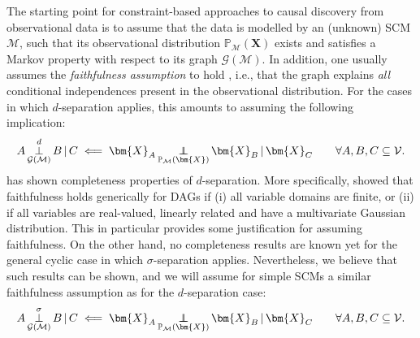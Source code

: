 \documentclass[twoside,11pt]{article}
\DeclareMathOperator*{\CI}{{\,\perp\mkern-12mu\perp\,}}
\DeclareMathOperator*{\SEP}{\perp}
\newcommand\indep[4]{{#1} \CI_{#4} {#2} \given {#3}}
\newcommand{\dsep}[4]{{#1} \SEP_{#4}^d {#2} \given {#3}}
\newcommand{\sigmasep}[4]{{#1} \SEP_{#4}^\sigma {#2} \given {#3}}
\newcommand{\Prb}{\mathbb{P}}
\newcommand\B[1]{\bm{#1}}
\newcommand\C[1]{\mathcal{#1}}
\newcommand\given{\,|\,}
\newcommand{\Joris}[1]{{\color{blue}#1}}
\begin{document}


The starting point for constraint-based approaches to causal discovery from observational data is 
to assume that the data is modelled by an (unknown) SCM $\C{M}$, such that its observational
distribution $\Prb_{\C{M}}(\B{X})$ exists and satisfies a Markov property with respect to its graph
$\C{G}(\C{M})$. In addition, one usually assumes the \emph{faithfulness assumption} to hold \citep{SGS2000,Pearl2009}, 
i.e., that the graph explains \emph{all} conditional independences present in the 
observational distribution. For the cases in which $d$-separation applies, this amounts to assuming
the following implication:
$$\dsep{A}{B}{C}{\C{G}(\C{M})} \impliedby \indep{\B{X}_A}{\B{X}_B}{\B{X}_C}{\Prb_{\C{M}}(\B{X})} \qquad \forall A,B,C \subseteq \C{V}.$$
\citet{Meek1995} has shown completeness properties of $d$-separation. More specifically,  \citet{Meek1995} 
showed that faithfulness holds generically for DAGs if (i) all variable domains are finite, or
(ii) if all variables are real-valued, linearly related and have a multivariate Gaussian distribution. 
This in particular provides some justification for assuming faithfulness.
On the other hand, no completeness results are known yet for the general
cyclic case in which $\sigma$-separation applies. Nevertheless, we believe that such results can be
shown, and we will assume for simple SCMs a similar faithfulness assumption as for the $d$-separation case:
$$\sigmasep{A}{B}{C}{\C{G}(\C{M})} \impliedby \indep{\B{X}_A}{\B{X}_B}{\B{X}_C}{\Prb_{\C{M}}(\B{X})} \qquad \forall A,B,C \subseteq \C{V}.$$
\end{document}
